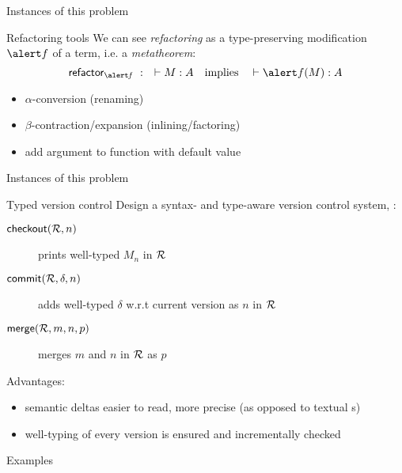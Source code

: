 \documentclass{beamer}
\theoremstyle{example}
\begin{document}
\begin{frame}{Instances of this problem}
  \begin{block}{Refactoring tools}
    We can see \emph{refactoring} as a type-preserving modification
    $\alert f$ of a term, i.e. a \emph{metatheorem}:
    $$ \funname{refactor_{\mathit{\alert f}}}\ :\quad \vdash M : A \quad\text{implies}\quad \vdash \alert f(M) : A $$
  \end{block}
  \begin{examples}
    \begin{itemize}
    \item $\alpha$-conversion (renaming)
    \item $\beta$-contraction/expansion (inlining/factoring)
    \item add argument to function with default value
    \end{itemize}
  \end{examples}
\end{frame}

\begin{frame}{Instances of this problem}
  \begin{block}{Typed version control}
    Design a syntax- and type-aware version control system, \ie:

    \begin{description}
    \item[${\rm\mathsf{checkout}}({\mathcal{R}, n})$] prints well-typed $M_n$ in $\mathcal{R}$
      \item[${\rm\mathsf{commit}}({\mathcal{R}, \delta, n})$] adds well-typed $\delta$
        w.r.t current version as $n$ in $\mathcal{R}$
      \item[${\rm\mathsf{merge}}({\mathcal{R}, m, n, p})$] merges $m$ and $n$ in $\mathcal{R}$ as $p$
    \end{description}

    Advantages:
    \begin{itemize}
    \item semantic deltas easier to read, more precise (as opposed to
      textual s)
    \item well-typing of every version is ensured and incrementally checked
    \end{itemize}
  \end{block}
\end{frame}

\begin{frame}{\textcolor{greenish}{Examples}}
\end{frame}
\end{document}
